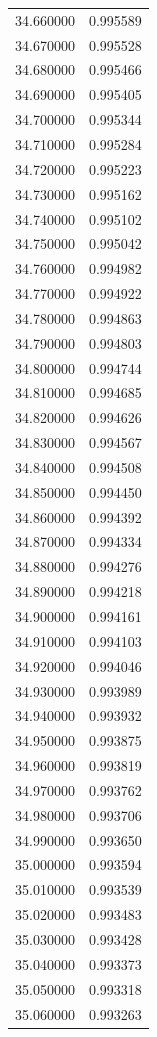 \begin{tabular}{rr}
34.660000 & 0.995589 \\
34.670000 & 0.995528 \\
34.680000 & 0.995466 \\
34.690000 & 0.995405 \\
34.700000 & 0.995344 \\
34.710000 & 0.995284 \\
34.720000 & 0.995223 \\
34.730000 & 0.995162 \\
34.740000 & 0.995102 \\
34.750000 & 0.995042 \\
34.760000 & 0.994982 \\
34.770000 & 0.994922 \\
34.780000 & 0.994863 \\
34.790000 & 0.994803 \\
34.800000 & 0.994744 \\
34.810000 & 0.994685 \\
34.820000 & 0.994626 \\
34.830000 & 0.994567 \\
34.840000 & 0.994508 \\
34.850000 & 0.994450 \\
34.860000 & 0.994392 \\
34.870000 & 0.994334 \\
34.880000 & 0.994276 \\
34.890000 & 0.994218 \\
34.900000 & 0.994161 \\
34.910000 & 0.994103 \\
34.920000 & 0.994046 \\
34.930000 & 0.993989 \\
34.940000 & 0.993932 \\
34.950000 & 0.993875 \\
34.960000 & 0.993819 \\
34.970000 & 0.993762 \\
34.980000 & 0.993706 \\
34.990000 & 0.993650 \\
35.000000 & 0.993594 \\
35.010000 & 0.993539 \\
35.020000 & 0.993483 \\
35.030000 & 0.993428 \\
35.040000 & 0.993373 \\
35.050000 & 0.993318 \\
35.060000 & 0.993263 \\

\end{tabular}
